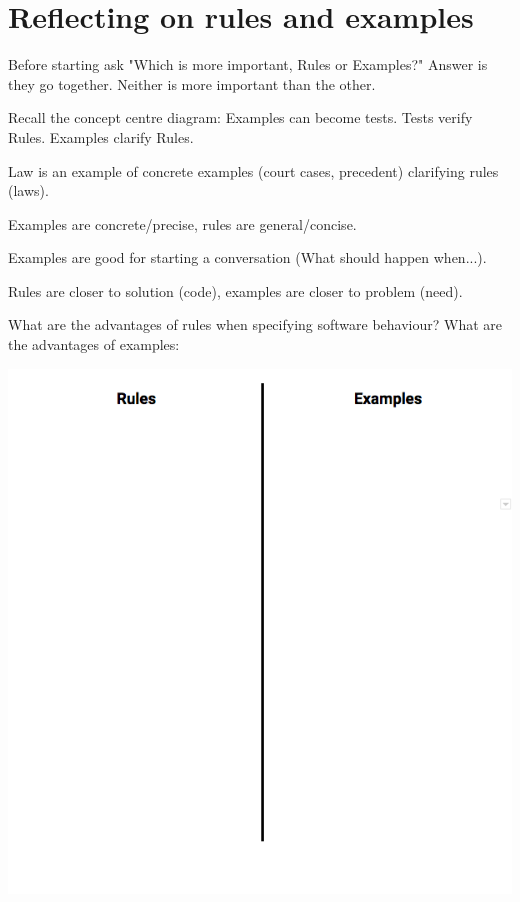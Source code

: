 \chapter*{Reflecting on rules and examples}

\ifnotes

    Before starting ask "Which is more important, Rules or Examples?" Answer is they go together. Neither is more important than the other.
    
    Recall the concept centre diagram: Examples can become tests. Tests verify Rules. Examples clarify Rules. 
    
    Law is an example of concrete examples (court cases, precedent) clarifying rules (laws). 
    
    Examples are concrete/precise, rules are general/concise.
    
    Examples are good for starting a conversation (What should happen when...).
    
    Rules are closer to solution (code), examples are closer to problem (need).
    
\fi 


\ifcontent

    
    
    What are the advantages of rules when specifying software behaviour? What are the advantages of examples:
    
    \includegraphics[width=\textwidth]{images/rules-examples}

\fi